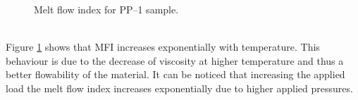 \documentclass[a4paper, 11pt]{article}
\begin{document}
\begin{figure}[h!]
	\centering
	 \quad
	\captionsetup{justification=centering}
	\caption{Melt flow index for PP–1 sample.}
	\label{fig:mfi}
\end{figure}\\
Figure \ref{fig:mfi} shows that MFI increases exponentially with temperature. This behaviour is due to the decrease of viscosity at higher temperature and thus a better flowability of the material. It can be noticed that increasing the applied load the melt flow index increases exponentially due to higher applied pressures.
\end{document}
